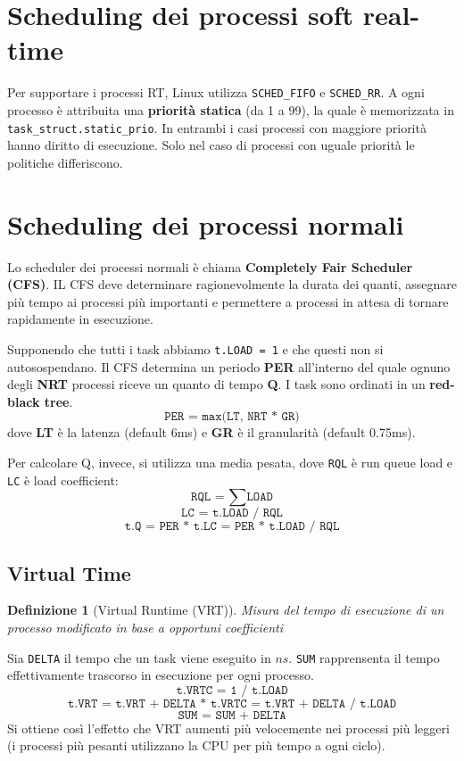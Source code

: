 \documentclass[12pt, a4paper]{report}
\newtheorem{definition}{Definizione}
\begin{document}
\section{Scheduling dei processi soft real-time}
Per supportare i processi RT, Linux utilizza \texttt{SCHED\_FIFO} e
\texttt{SCHED\_RR}. A ogni processo è attribuita una \textbf{priorità statica}
(da 1 a 99), la quale è memorizzata in \texttt{task\_struct.static\_prio}.
In entrambi i casi processi con maggiore priorità hanno diritto di esecuzione.
Solo nel caso di processi con uguale priorità le politiche differiscono.

\section{Scheduling dei processi normali}
Lo scheduler dei processi normali è chiama \textbf{Completely Fair
Scheduler (CFS)}. IL CFS deve determinare ragionevolmente la durata dei
quanti, assegnare più tempo ai processi più importanti e permettere a processi
in attesa di tornare rapidamente in esecuzione.

Supponendo che tutti i task abbiamo \texttt{t.LOAD = 1} e che questi non si
autosospendano. Il CFS determina un periodo \textbf{PER} all'interno del quale
ognuno degli \textbf{NRT} processi riceve un quanto di tempo \textbf{Q}.
I task sono ordinati in un \textbf{red-black tree}.
\[
	\texttt{PER = max(LT, NRT * GR)}
\]
dove \textbf{LT} è la latenza (default 6ms) e \textbf{GR} è il granularità
(default 0.75ms).

Per calcolare Q, invece, si utilizza una media pesata, dove \texttt{RQL} è run
queue load e \texttt{LC} è load coefficient:
\[
	\texttt{RQL = } \sum \texttt{LOAD}
\]
\[
	\texttt{LC = t.LOAD / RQL}
\]
\[
	\texttt{t.Q = PER * t.LC = PER * t.LOAD / RQL}
\]

\subsection{Virtual Time}
\begin{definition}[Virtual Runtime (VRT)]
	Misura del tempo di esecuzione di un processo modificato in base a opportuni
	coefficienti
\end{definition}
Sia \texttt{DELTA} il tempo che un task viene eseguito in $ns$. \texttt{SUM}
rapprensenta il tempo effettivamente trascorso in esecuzione per ogni processo.
\[
	\texttt{t.VRTC = 1 / t.LOAD}
\]
\[
	\texttt{t.VRT = t.VRT + DELTA * t.VRTC = t.VRT + DELTA / t.LOAD}
\]
\[
	\texttt{SUM = SUM + DELTA}
\]
Si ottiene così l'effetto che VRT aumenti più velocemente nei processi più
leggeri (i processi più pesanti utilizzano la CPU per più tempo a ogni ciclo).
\end{document}
